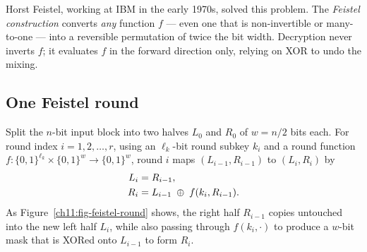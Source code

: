 Horst Feistel, working at IBM in the early 1970s, solved this problem. The \emph{Feistel construction} converts \emph{any} function $f$ --- even one that is non-invertible or many-to-one --- into a reversible permutation of twice the bit width. Decryption never inverts $f$; it evaluates $f$ in the forward direction only, relying on XOR to undo the mixing.

\subsection{One Feistel round}

Split the $n$-bit input block into two halves $L_0$ and $R_0$ of $w = n/2$ bits each. For round index $i = 1, 2, \dots, r$, using an $\ell_k$-bit round subkey $k_i$ and a round function $f : \{0,1\}^{\ell_k} \times \{0,1\}^w \to \{0,1\}^w$, round $i$ maps $(L_{i-1}, R_{i-1})$ to $(L_i, R_i)$ by
\begin{align}
L_i &= R_{i-1}, \label{eq:feistel-L} \\
R_i &= L_{i-1} \;\oplus\; f(k_i, R_{i-1}). \label{eq:feistel-R}
\end{align}
As Figure~\ref{ch11:fig-feistel-round} shows, the right half $R_{i-1}$ copies untouched into the new left half $L_i$, while also passing through $f(k_i, \cdot)$ to produce a $w$-bit mask that is XORed onto $L_{i-1}$ to form $R_i$.

